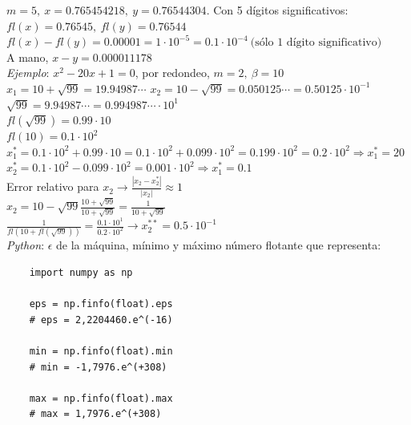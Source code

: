 $m = 5,\ x = 0.765454218,\ y = 0.76544304$. Con 5 d\'igitos significativos:\\

$fl(x) = 0.76545,\ fl(y) = 0.76544$\\

$fl(x) - fl(y) = 0.00001 = 1\cdot10^{-5} = 0.1\cdot10^{-4}\ \text{(s\'olo 1 d\'igito significativo)}$\\

A mano, $x - y = 0.000011178$\\

\textit{Ejemplo}: $x^{2} - 20x + 1 = 0$, por redondeo, $m = 2,\ \beta = 10$\\

$x_{1} = 10 + \sqrt{99} = 19.94987\cdots$
$x_{2} = 10 - \sqrt{99} = 0.050125\cdots = 0.50125\cdot10^{-1}$\\

$\sqrt{99} = 9.94987\cdots = 0.994987\cdots \cdot 10^{1}$\\

$fl(\sqrt{99}) = 0.99\cdot10$\\

$fl(10) = 0.1\cdot10^{2}$\\

$x_{1}^{*} = 0.1\cdot10^{2} + 0.99\cdot10 = 0.1\cdot10^{2} + 0.099\cdot10^{2} = 0.199\cdot10^{2} = 0.2\cdot10^{2} \Rightarrow x_{1}^{*} = 20$\\

$x_{2}^{*} = 0.1\cdot10^{2} - 0.099\cdot10^{2} = 0.001\cdot10^{2} \Rightarrow x_{1}^{*} = 0.1$\\

Error relativo para $x_{2} \rightarrow \frac{|x_{2} - x_{2}^{*}|}{|x_{2}|} \approx 1$\\

$x_{2} = 10 - \sqrt{99} \frac{10 + \sqrt{99}}{10 + \sqrt{99}} = \frac{1}{10 + \sqrt{99}}$\\

$\frac{1}{fl(10 + fl(\sqrt{99}))} = \frac{0.1\cdot10^{1}}{0.2\cdot10^{2}} \rightarrow x_{2}^{**} = 0.5\cdot10^{-1}$\\


\textit{Python}: $\epsilon$ de la m\'aquina, m\'inimo y m\'aximo n\'umero flotante que representa:\\

\begin{verbatim}
	import numpy as np
	
	eps = np.finfo(float).eps
	# eps = 2,2204460.e^(-16)
	
	min = np.finfo(float).min
	# min = -1,7976.e^(+308)
	
	max = np.finfo(float).max
	# max = 1,7976.e^(+308)
\end{verbatim}